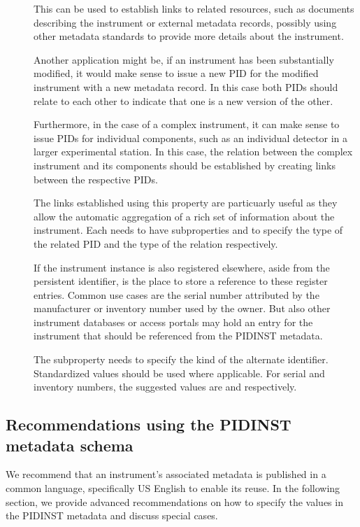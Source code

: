 \documentclass[a4paper,10pt,english]{sphinxmanual}
\begin{document}
\begin{description}
\item[{}] \leavevmode
This can be used to establish links to related resources, such as
documents describing the instrument or external metadata records,
possibly using other metadata standards to provide more details
about the instrument.

Another application might be, if an instrument has been
substantially modified, it would make sense to issue a new PID for
the modified instrument with a new metadata record.  In this case
both PIDs should relate to each other to indicate that one is a new
version of the other.

Furthermore, in the case of a complex instrument, it can make sense
to issue PIDs for individual components, such as an individual
detector in a larger experimental station.  In this case, the
relation between the complex instrument and its components should be
established by creating links between the respective PIDs.

The links established using this property are particuarly useful as
they allow the automatic aggregation of a rich set of information
about the instrument.  Each  needs to have
subproperties  and  to specify
the type of the related PID and the type of the relation
respectively.

\item[{}] \leavevmode
If the instrument instance is also registered elsewhere, aside from
the persistent identifier,  is the place to
store a reference to these register entries.  Common use cases are
the serial number attributed by the manufacturer or inventory number
used by the owner.  But also other instrument databases or access
portals may hold an entry for the instrument that should be
referenced from the PIDINST metadata.

The subproperty  needs to specify the kind
of the alternate identifier.  Standardized values should be used
where applicable.  For serial and inventory numbers, the suggested
values are  and  respectively.

\end{description}


\subsection{Recommendations using the PIDINST metadata schema}
\label{\detokenize{white-paper/metadata-schema-recommendations:recommendations-using-the-pidinst-metadata-schema}}\label{\detokenize{white-paper/metadata-schema-recommendations:pidinst-metadata-schema-recommendations}}\label{\detokenize{white-paper/metadata-schema-recommendations::doc}}
We recommend that an instrument’s associated metadata is published in a common language,
specifically US English to enable its reuse.  In the following section, we provide
advanced recommendations on how to specify the values in the PIDINST
metadata and discuss special cases.
\end{document}
